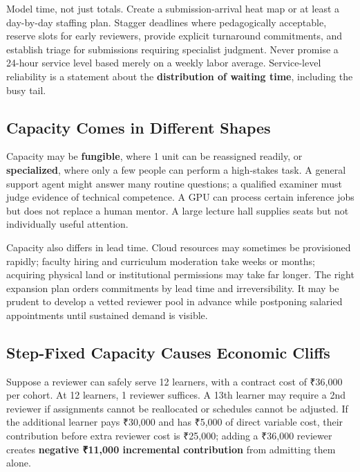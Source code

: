 Model time, not just totals. Create a submission-arrival heat map or at least a day-by-day staffing plan. Stagger deadlines where pedagogically acceptable, reserve slots for early reviewers, provide explicit turnaround commitments, and establish triage for submissions requiring specialist judgment. Never promise a 24-hour service level based merely on a weekly labor average. Service-level reliability is a statement about the \textbf{distribution of waiting time}, including the busy tail.

\subsection{Capacity Comes in Different Shapes}
\label{sec:capacity_different_shapes}

Capacity may be \textbf{fungible}, where 1 unit can be reassigned readily, or \textbf{specialized}, where only a few people can perform a high-stakes task. A general support agent might answer many routine questions; a qualified examiner must judge evidence of technical competence. A GPU can process certain inference jobs but does not replace a human mentor. A large lecture hall supplies seats but not individually useful attention.

Capacity also differs in lead time. Cloud resources may sometimes be provisioned rapidly; faculty hiring and curriculum moderation take weeks or months; acquiring physical land or institutional permissions may take far longer. The right expansion plan orders commitments by lead time and irreversibility. It may be prudent to develop a vetted reviewer pool in advance while postponing salaried appointments until sustained demand is visible.

\subsection{Step-Fixed Capacity Causes Economic Cliffs}
\label{sec:step_fixed_capacity_cliffs}

Suppose a reviewer can safely serve 12 learners, with a contract cost of ₹36,000 per cohort. At 12 learners, 1 reviewer suffices. A 13th learner may require a 2nd reviewer if assignments cannot be reallocated or schedules cannot be adjusted. If the additional learner pays ₹30,000 and has ₹5,000 of direct variable cost, their contribution before extra reviewer cost is ₹25,000; adding a ₹36,000 reviewer creates \textbf{negative ₹11,000 incremental contribution} from admitting them alone.

